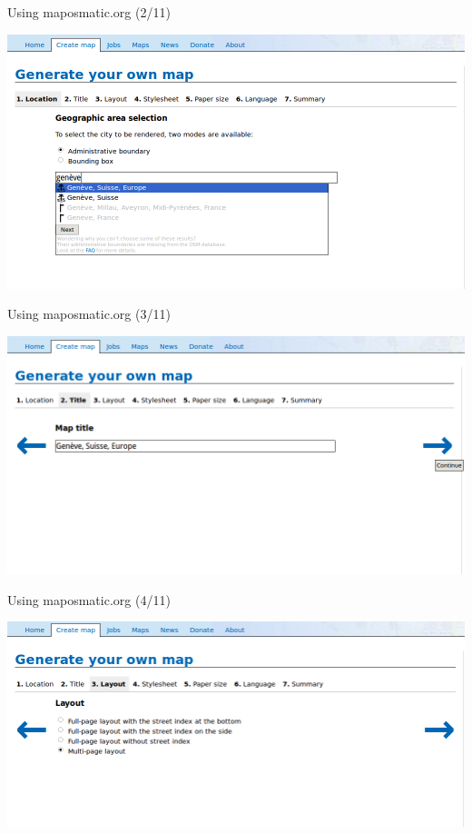 \documentclass{beamer}
\begin{document}
\begin{frame}{Using maposmatic.org (2/11)}
  \begin{center}
    \includegraphics[width=\textwidth]{screenshot2.png}
  \end{center}
\end{frame}

\begin{frame}{Using maposmatic.org (3/11)}
  \begin{center}
    \includegraphics[width=\textwidth]{screenshot3.png}
  \end{center}
\end{frame}

\begin{frame}{Using maposmatic.org (4/11)}
  \begin{center}
    \includegraphics[width=\textwidth]{screenshot4.png}
  \end{center}
\end{frame}
\end{document}

